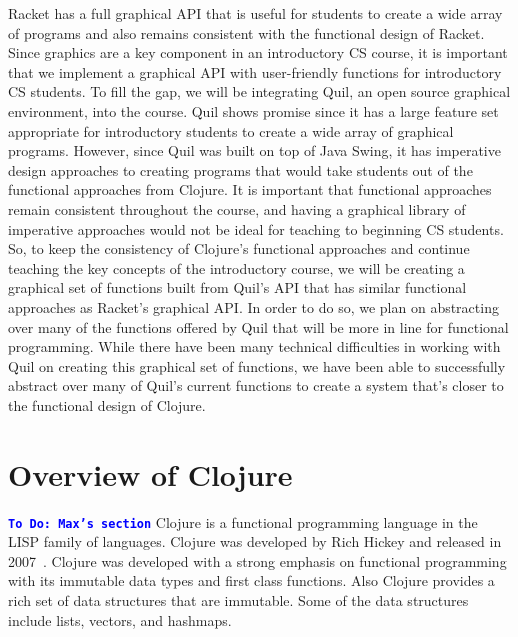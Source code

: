 \documentclass[12pt]{article}
\newcommand{\comment}[1]{{\bf \tt  {#1}}}
\newcommand{\todo}[1]{\textcolor{blue}{\comment{To Do: {#1}}}}
\begin{document}
Racket has a full graphical API that is useful for students to create a wide array of programs and also remains consistent with the functional design of Racket. Since graphics are a key component in an introductory CS course, it is important that we implement a graphical API with user-friendly functions for introductory CS students. To fill the gap, we will be integrating Quil, an open source graphical environment, into the course. Quil shows promise since it has a large feature set appropriate for introductory students to create a wide array of graphical programs. However, since Quil was built on top of Java Swing, it has imperative design approaches to creating programs that would take students out of the functional approaches from Clojure. It is important that functional approaches remain consistent throughout the course, and having a graphical library of imperative approaches would not be ideal for teaching to beginning CS students. So, to keep the consistency of Clojure’s functional approaches and continue teaching the key concepts of the introductory course, we will be creating a graphical set of functions built from Quil’s API that has similar functional approaches as Racket’s graphical API. In order to do so, we plan on abstracting over many of the functions offered by Quil that will be more in line for functional programming. While there have been many technical difficulties in working with Quil on creating this graphical set of functions, we have been able to successfully abstract over many of Quil’s current functions to create a system that’s closer to the functional design of Clojure. 

\section{Overview of Clojure}\label{sec:clojure}
\todo{Max's section}
Clojure is a functional programming language in the LISP family of languages. Clojure was developed by Rich Hickey and released in 2007~\cite{Hickey:2008}. Clojure was developed with a strong emphasis on functional programming with its immutable data types and first class functions. Also Clojure provides a rich set of data structures that are immutable. Some of the data structures include lists, vectors, and hashmaps.
\end{document}
